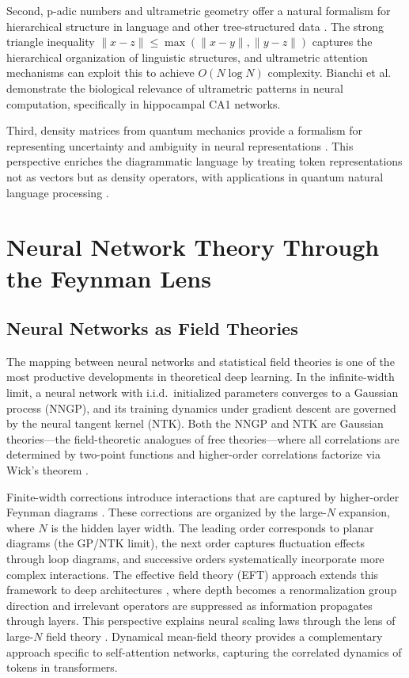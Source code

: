 \documentclass[12pt,a4paper]{article}
\begin{document}
Second, p-adic numbers and ultrametric geometry offer a natural formalism for hierarchical structure in language and other tree-structured data \cite{murtagh2008from}. The strong triangle inequality $\|x - z\| \leq \max(\|x - y\|, \|y - z\|)$ captures the hierarchical organization of linguistic structures, and ultrametric attention mechanisms can exploit this to achieve $O(N \log N)$ complexity. Bianchi et al.~\cite{bianchi2013storage} demonstrate the biological relevance of ultrametric patterns in neural computation, specifically in hippocampal CA1 networks.

Third, density matrices from quantum mechanics provide a formalism for representing uncertainty and ambiguity in neural representations \cite{sharma2026decision}. This perspective enriches the diagrammatic language by treating token representations not as vectors but as density operators, with applications in quantum natural language processing \cite{meichanetzidis2021quantum}.

\section{Neural Network Theory Through the Feynman Lens}
\subsection{Neural Networks as Field Theories}

The mapping between neural networks and statistical field theories is one of the most productive developments in theoretical deep learning. In the infinite-width limit, a neural network with i.i.d.\ initialized parameters converges to a Gaussian process (NNGP), and its training dynamics under gradient descent are governed by the neural tangent kernel (NTK). Both the NNGP and NTK are Gaussian theories---the field-theoretic analogues of free theories---where all correlations are determined by two-point functions and higher-order correlations factorize via Wick's theorem \cite{neural2024neural}.

Finite-width corrections introduce interactions that are captured by higher-order Feynman diagrams \cite{guillen2025finitewidth}. These corrections are organized by the large-$N$ expansion, where $N$ is the hidden layer width. The leading order corresponds to planar diagrams (the GP/NTK limit), the next order captures fluctuation effects through loop diagrams, and successive orders systematically incorporate more complex interactions. The effective field theory (EFT) approach extends this framework to deep architectures \cite{banta2024structures}, where depth becomes a renormalization group direction and irrelevant operators are suppressed as information propagates through layers. This perspective explains neural scaling laws through the lens of large-$N$ field theory \cite{neural2025neural}. Dynamical mean-field theory \cite{tiberi2024dynamical} provides a complementary approach specific to self-attention networks, capturing the correlated dynamics of tokens in transformers.
\end{document}
